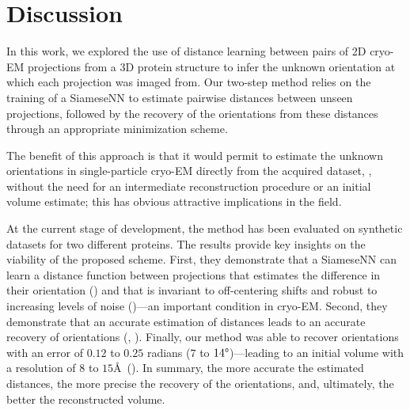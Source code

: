 \section{Discussion}\label{sec:discussion}

In this work, we explored the use of distance learning between pairs of 2D cryo-EM projections from a 3D protein structure to infer the unknown orientation at which each projection was imaged from.
Our two-step method relies on the training of a SiameseNN to estimate pairwise distances between unseen projections, followed by the recovery of the orientations from these distances through an appropriate minimization scheme.

The benefit of this approach is that it would permit to estimate the unknown orientations in single-particle cryo-EM directly from the acquired dataset, \ie, without the need for an intermediate reconstruction procedure or an initial volume estimate; this has obvious attractive implications in the field.

At the current stage of development, the method has been evaluated on synthetic datasets for two different proteins.
The results provide key insights on the viability of the proposed scheme.
First, they demonstrate that a SiameseNN can learn a distance function between projections that estimates the difference in their orientation () and that is invariant to off-centering shifts and robust to increasing levels of noise ()---an important condition in cryo-EM\@.
Second, they demonstrate that an accurate estimation of distances leads to an accurate recovery of orientations (, ).
Finally, our method was able to recover orientations with an error of $0.12$ to $0.25$ radians ($7$ to $14\degree$)---leading to an initial volume
with a resolution of $8$ to $15$\AA\ ().
In summary, the more accurate the estimated distances, the more precise the recovery of the orientations, and, ultimately, the better the reconstructed volume.

